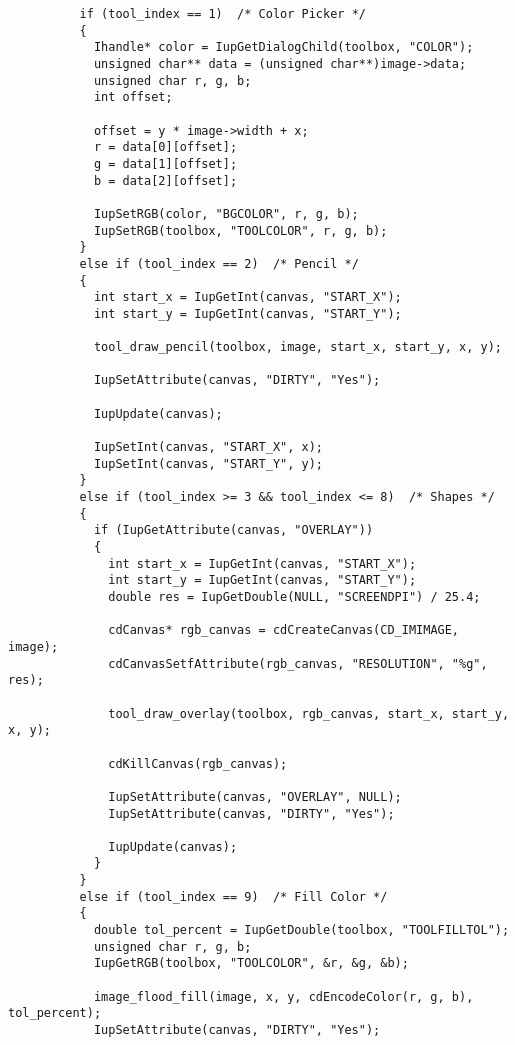 \documentclass{ctexart}
\begin{document}
\begin{lstlisting}
          if (tool_index == 1)  /* Color Picker */
          {
            Ihandle* color = IupGetDialogChild(toolbox, "COLOR");
            unsigned char** data = (unsigned char**)image->data;
            unsigned char r, g, b;
            int offset;

            offset = y * image->width + x;
            r = data[0][offset];
            g = data[1][offset];
            b = data[2][offset];

            IupSetRGB(color, "BGCOLOR", r, g, b);
            IupSetRGB(toolbox, "TOOLCOLOR", r, g, b);
          }
          else if (tool_index == 2)  /* Pencil */
          {
            int start_x = IupGetInt(canvas, "START_X");
            int start_y = IupGetInt(canvas, "START_Y");

            tool_draw_pencil(toolbox, image, start_x, start_y, x, y);

            IupSetAttribute(canvas, "DIRTY", "Yes");

            IupUpdate(canvas);

            IupSetInt(canvas, "START_X", x);
            IupSetInt(canvas, "START_Y", y);
          }
          else if (tool_index >= 3 && tool_index <= 8)  /* Shapes */
          {
            if (IupGetAttribute(canvas, "OVERLAY"))
            {
              int start_x = IupGetInt(canvas, "START_X");
              int start_y = IupGetInt(canvas, "START_Y");
              double res = IupGetDouble(NULL, "SCREENDPI") / 25.4;
  
              cdCanvas* rgb_canvas = cdCreateCanvas(CD_IMIMAGE, image);
              cdCanvasSetfAttribute(rgb_canvas, "RESOLUTION", "%g", res);

              tool_draw_overlay(toolbox, rgb_canvas, start_x, start_y, x, y);

              cdKillCanvas(rgb_canvas);

              IupSetAttribute(canvas, "OVERLAY", NULL);
              IupSetAttribute(canvas, "DIRTY", "Yes");

              IupUpdate(canvas);
            }
          }
          else if (tool_index == 9)  /* Fill Color */
          {
            double tol_percent = IupGetDouble(toolbox, "TOOLFILLTOL");
            unsigned char r, g, b;
            IupGetRGB(toolbox, "TOOLCOLOR", &r, &g, &b);

            image_flood_fill(image, x, y, cdEncodeColor(r, g, b), tol_percent);
            IupSetAttribute(canvas, "DIRTY", "Yes");


\end{lstlisting}
\end{document}
